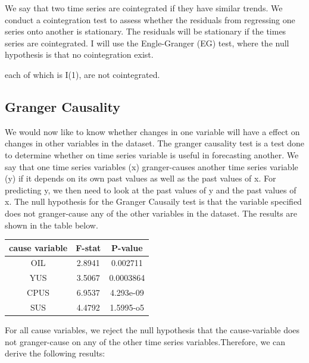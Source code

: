 \documentclass[11pt,preprint, authoryear]{elsarticle}
\numberwithin{equation}{section}
\numberwithin{figure}{section}
\numberwithin{table}{section}
\begin{document}
We say that two time series are cointegrated if they have similar
trends. We conduct a cointegration test to assess whether the residuals
from regressing one series onto another is stationary. The residuals
will be stationary if the times series are cointegrated. I will use the
Engle-Granger (EG) test, where the null hypothesis is that no
cointegration exist.

each of which is I(1), are not cointegrated.

\hypertarget{granger-causality}{%
\subsection{Granger Causality}\label{granger-causality}}

We would now like to know whether changes in one variable will have a
effect on changes in other variables in the dataset. The granger
causality test is a test done to determine whether on time series
variable is useful in forecasting another. We say that one time series
variables (x) granger-causes another time series variable (y) if it
depends on its own past values as well as the past values of x. For
predicting y, we then need to look at the past values of y and the past
values of x. The null hypothesis for the Granger Causaily test is that
the variable specified does not granger-cause any of the other variables
in the dataset. The results are shown in the table below.

\begin{center}
\begin{tabular}{ |c|c|c| } 
 \hline
 cause variable & F-stat & P-value \\ 
 \hline
 OIL & 2.8941 & 0.002711\\ 
 YUS & 3.5067 & 0.0003864 \\
 CPUS & 6.9537 & 4.293e-09\\
 SUS & 4.4792 & 1.5995-o5 \\
 \hline
\end{tabular}
\end{center}

For all cause variables, we reject the null hypothesis that the
cause-variable does not granger-cause on any of the other time series
variables.Therefore, we can derive the following results:
\end{document}
